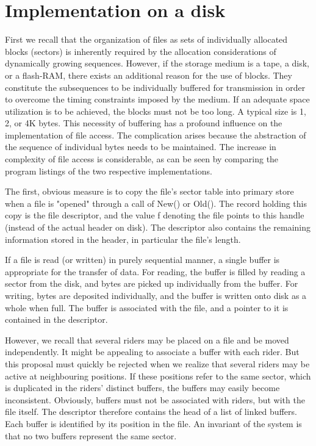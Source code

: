 \section{Implementation on a disk}
First we recall that the organization of files as sets of individually allocated blocks (sectors) is
inherently required by the allocation considerations of dynamically growing sequences. However,
if the storage medium is a tape, a disk, or a flash-RAM, there exists an additional reason for the
use of blocks. They constitute the subsequences to be individually buffered for transmission in
order to overcome the timing constraints imposed by the medium. If an adequate space utilization
is to be achieved, the blocks must not be too long. A typical size is 1, 2, or 4K bytes.
This necessity of buffering has a profound influence on the implementation of file access. The
complication arises because the abstraction of the sequence of individual bytes needs to be
maintained. The increase in complexity of file access is considerable, as can be seen by
comparing the program listings of the two respective implementations.

The first, obvious measure is to copy the file's sector table into primary store when a file is
"opened" through a call of New() or Old(). The record holding this copy is the file descriptor, and
the value f denoting the file points to this handle (instead of the actual header on disk). The
descriptor also contains the remaining information stored in the header, in particular the file's
length.

If a file is read (or written) in purely sequential manner, a single buffer is appropriate for the
transfer of data. For reading, the buffer is filled by reading a sector from the disk, and bytes are
picked up individually from the buffer. For writing, bytes are deposited individually, and the buffer
is written onto disk as a whole when full. The buffer is associated with the file, and a pointer to it
is contained in the descriptor.

However, we recall that several riders may be placed on a file and be moved independently. It
might be appealing to associate a buffer with each rider. But this proposal must quickly be
rejected when we realize that several riders may be active at neighbouring positions. If these
positions refer to the same sector, which is duplicated in the riders' distinct buffers, the buffers
may easily become inconsistent. Obviously, buffers must not be associated with riders, but with
the file itself. The descriptor therefore contains the head of a list of linked buffers. Each buffer is
identified by its position in the file. An invariant of the system is that no two buffers represent the
same sector.

